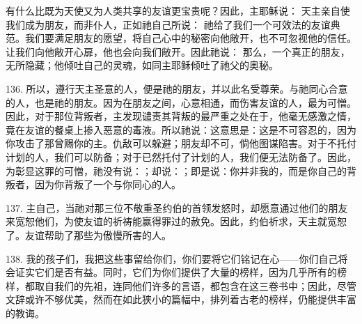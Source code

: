 有什么比既为天使又为人类共享的友谊更宝贵呢？因此，主耶稣说： 天主亲自使我们成为朋友，而非仆人，正如祂自己所说： 祂给了我们一个可效法的友谊典范。我们要满足朋友的愿望，将自己心中的秘密向他敞开，也不可忽视他的信任。让我们向他敞开心扉，他也会向我们敞开。因此祂说： 那么，一个真正的朋友，无所隐藏；他倾吐自己的灵魂，如同主耶稣倾吐了祂父的奥秘。\par

136. 所以，遵行天主圣意的人，便是祂的朋友，并以此名受尊荣。与祂同心合意的人，也是祂的朋友。因为在朋友之间，心意相通，而伤害友谊的人，最为可憎。因此，对于那位背叛者，主发现谴责其背叛的最严重之处在于，他毫无感激之情，竟在友谊的餐桌上掺入恶意的毒液。所以祂说：这意思是：这是不可容忍的，因为你攻击了那曾赐你的主。仇敌可以躲避；朋友却不可，倘他图谋陷害。对于不托付计划的人，我们可以防备；对于已然托付了计划的人，我们便无法防备了。因此，为彰显这罪的可憎，祂没有说：；却说：；即是说：你并非我的，而是你自己的背叛者，因为你背叛了一个与你同心的人。\par

137. 主自己，当祂对那三位不敬重圣约伯的首领发怒时，却愿意通过他们的朋友来宽恕他们，为使友谊的祈祷能赢得罪过的赦免。因此，约伯祈求，天主就宽恕了。友谊帮助了那些为傲慢所害的人。\par

138. 我的孩子们，我把这些事留给你们，你们要将它们铭记在心——你们自己将会证实它们是否有益。同时，它们为你们提供了大量的榜样，因为几乎所有的榜样，都取自我们的先祖，连同他们许多的言语，都包含在这三卷书中；因此，尽管文辞或许不够优美，然而在如此狭小的篇幅中，排列着古老的榜样，仍能提供丰富的教诲。\par

